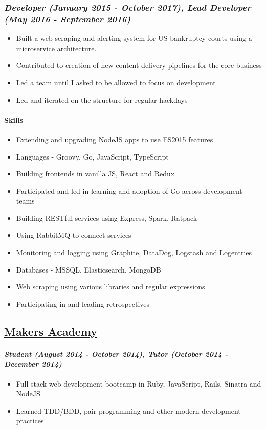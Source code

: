 \documentclass[11pt]{article}
\begin{document}
\subsubsection*{\emph{Developer (January 2015 - October 2017), Lead Developer (May 2016 - September 2016)}}
\label{sec:org9cfc21a}
\begin{itemize}
\item Built a web-scraping and alerting system for US bankruptcy courts using a microservice architecture.
\item Contributed to creation of new content delivery pipelines for the core business
\item Led a team until I asked to be allowed to focus on development
\item Led and iterated on the structure for regular hackdays
\end{itemize}

\paragraph*{Skills}
\label{sec:org8560c44}
\begin{itemize}
\item Extending and upgrading NodeJS apps to use ES2015 features
\item Languages - Groovy, Go, JavaScript, TypeScript
\item Building frontends in vanilla JS, React and Redux
\item Participated and led in learning and adoption of Go across development teams
\item Building RESTful services using Express, Spark, Ratpack
\item Using RabbitMQ to connect services
\item Monitoring and logging using Graphite, DataDog, Logstash and Logentries
\item Databases - MSSQL, Elasticsearch, MongoDB
\item Web scraping using various libraries and regular expressions
\item Participating in and leading retrospectives
\end{itemize}

\subsection*{\href{http://www.makersacademy.com/}{Makers Academy}}
\label{sec:org960a514}
\paragraph*{\emph{Student (August 2014 - October 2014), Tutor (October 2014 - December 2014)}}
\label{sec:org0329bb4}
\begin{itemize}
\item Full-stack web development bootcamp in Ruby, JavaScript, Rails, Sinatra and NodeJS
\item Learned TDD/BDD, pair programming and other modern development practices
\end{itemize}
\end{document}
